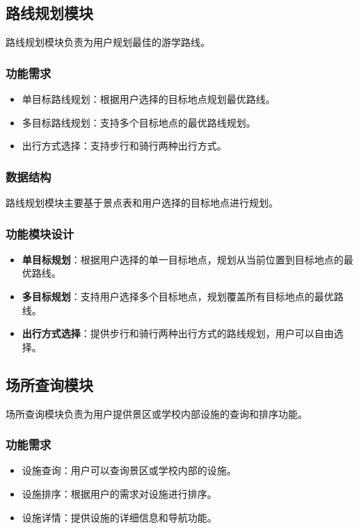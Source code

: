 \documentclass{ctexart}
\begin{document}
\subsection{路线规划模块}
路线规划模块负责为用户规划最佳的游学路线。

\subsubsection{功能需求}
\begin{itemize}
    \item 单目标路线规划：根据用户选择的目标地点规划最优路线。
    \item 多目标路线规划：支持多个目标地点的最优路线规划。
    \item 出行方式选择：支持步行和骑行两种出行方式。
\end{itemize}

\subsubsection{数据结构}
路线规划模块主要基于景点表和用户选择的目标地点进行规划。

\subsubsection{功能模块设计}
\begin{itemize}
    \item \textbf{单目标规划}：根据用户选择的单一目标地点，规划从当前位置到目标地点的最优路线。
    \item \textbf{多目标规划}：支持用户选择多个目标地点，规划覆盖所有目标地点的最优路线。
    \item \textbf{出行方式选择}：提供步行和骑行两种出行方式的路线规划，用户可以自由选择。
\end{itemize}

\subsection{场所查询模块}
场所查询模块负责为用户提供景区或学校内部设施的查询和排序功能。

\subsubsection{功能需求}
\begin{itemize}
    \item 设施查询：用户可以查询景区或学校内部的设施。
    \item 设施排序：根据用户的需求对设施进行排序。
    \item 设施详情：提供设施的详细信息和导航功能。
\end{itemize}
\end{document}
